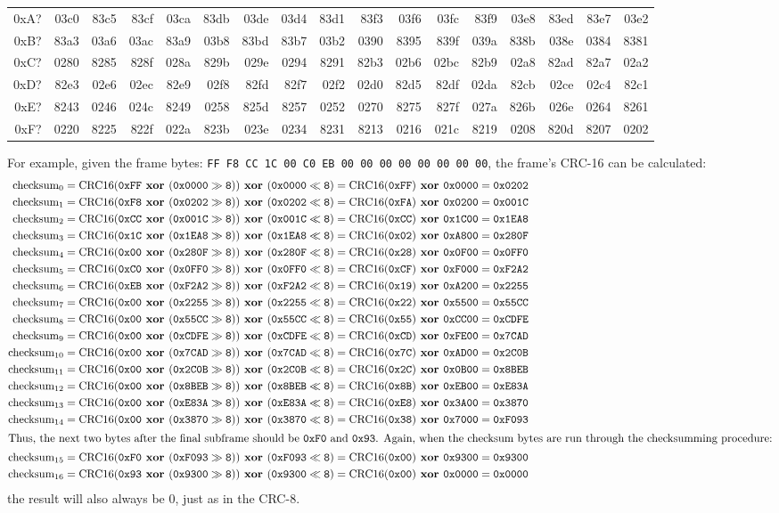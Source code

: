 \begin{table}[h]
{\begin{tabular}{|r||r|r|r|r|r|r|r|r|r|r|r|r|r|r|r|r|}
0xA? & 03c0 & 83c5 & 83cf & 03ca & 83db & 03de & 03d4 & 83d1 & 83f3 & 03f6 & 03fc & 83f9 & 03e8 & 83ed & 83e7 & 03e2 \\
0xB? & 83a3 & 03a6 & 03ac & 83a9 & 03b8 & 83bd & 83b7 & 03b2 & 0390 & 8395 & 839f & 039a & 838b & 038e & 0384 & 8381 \\
0xC? & 0280 & 8285 & 828f & 028a & 829b & 029e & 0294 & 8291 & 82b3 & 02b6 & 02bc & 82b9 & 02a8 & 82ad & 82a7 & 02a2 \\
0xD? & 82e3 & 02e6 & 02ec & 82e9 & 02f8 & 82fd & 82f7 & 02f2 & 02d0 & 82d5 & 82df & 02da & 82cb & 02ce & 02c4 & 82c1 \\
0xE? & 8243 & 0246 & 024c & 8249 & 0258 & 825d & 8257 & 0252 & 0270 & 8275 & 827f & 027a & 826b & 026e & 0264 & 8261 \\
0xF? & 0220 & 8225 & 822f & 022a & 823b & 023e & 0234 & 8231 & 8213 & 0216 & 021c & 8219 & 0208 & 820d & 8207 & 0202 \\
\hline
\end{tabular}
}
\end{table}
\par
\noindent
For example, given the frame bytes:
\texttt{FF F8 CC 1C 00 C0 EB 00 00 00 00 00 00 00 00},
the frame's CRC-16 can be calculated:
{
\begin{align*}
\CRCSIXTEEN{0}{0xFF}{0x0000}{0xFF}{0x0000}{0x0202} \\
\CRCSIXTEEN{1}{0xF8}{0x0202}{0xFA}{0x0200}{0x001C} \\
\CRCSIXTEEN{2}{0xCC}{0x001C}{0xCC}{0x1C00}{0x1EA8} \\
\CRCSIXTEEN{3}{0x1C}{0x1EA8}{0x02}{0xA800}{0x280F} \\
\CRCSIXTEEN{4}{0x00}{0x280F}{0x28}{0x0F00}{0x0FF0} \\
\CRCSIXTEEN{5}{0xC0}{0x0FF0}{0xCF}{0xF000}{0xF2A2} \\
\CRCSIXTEEN{6}{0xEB}{0xF2A2}{0x19}{0xA200}{0x2255} \\
\CRCSIXTEEN{7}{0x00}{0x2255}{0x22}{0x5500}{0x55CC} \\
\CRCSIXTEEN{8}{0x00}{0x55CC}{0x55}{0xCC00}{0xCDFE} \\
\CRCSIXTEEN{9}{0x00}{0xCDFE}{0xCD}{0xFE00}{0x7CAD} \\
\CRCSIXTEEN{10}{0x00}{0x7CAD}{0x7C}{0xAD00}{0x2C0B} \\
\CRCSIXTEEN{11}{0x00}{0x2C0B}{0x2C}{0x0B00}{0x8BEB} \\
\CRCSIXTEEN{12}{0x00}{0x8BEB}{0x8B}{0xEB00}{0xE83A} \\
\CRCSIXTEEN{13}{0x00}{0xE83A}{0xE8}{0x3A00}{0x3870} \\
\CRCSIXTEEN{14}{0x00}{0x3870}{0x38}{0x7000}{0xF093} \\
\intertext{Thus, the next two bytes after the final subframe should be
\texttt{0xF0} and \texttt{0x93}.
Again, when the checksum bytes are run through the checksumming procedure:}
\CRCSIXTEEN{15}{0xF0}{0xF093}{0x00}{0x9300}{0x9300} \\
\CRCSIXTEEN{16}{0x93}{0x9300}{0x00}{0x0000}{0x0000}
\end{align*}
the result will also always be 0, just as in the CRC-8.
}

